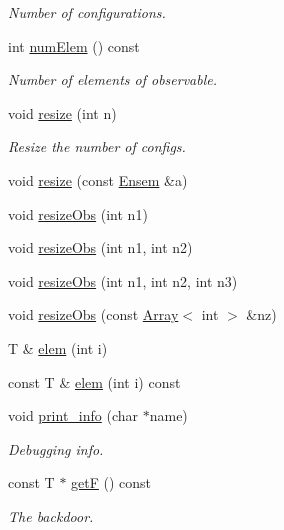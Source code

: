 \begin{DoxyCompactItemize}
\begin{DoxyCompactList}\small\item\em Number of configurations. \end{DoxyCompactList}\item 
int \mbox{\hyperlink{classENSEM_1_1Ensem_a495a563176192200eca2f16978158750}{num\+Elem}} () const
\begin{DoxyCompactList}\small\item\em Number of elements of observable. \end{DoxyCompactList}\item 
void \mbox{\hyperlink{classENSEM_1_1Ensem_ae43aa68aaca92143baffe83310657f4a}{resize}} (int n)
\begin{DoxyCompactList}\small\item\em Resize the number of configs. \end{DoxyCompactList}\item 
void \mbox{\hyperlink{classENSEM_1_1Ensem_acf1e1629e4e10dbd254d81d14271b763}{resize}} (const \mbox{\hyperlink{classENSEM_1_1Ensem}{Ensem}} \&a)
\item 
void \mbox{\hyperlink{classENSEM_1_1Ensem_a20ee27dffc4b1db635103ce40fb0d5c2}{resize\+Obs}} (int n1)
\item 
void \mbox{\hyperlink{classENSEM_1_1Ensem_af74074307267e421a53a3e9e9e2449fc}{resize\+Obs}} (int n1, int n2)
\item 
void \mbox{\hyperlink{classENSEM_1_1Ensem_a8d63351cad23f2af13f26c7326d1abcf}{resize\+Obs}} (int n1, int n2, int n3)
\item 
void \mbox{\hyperlink{classENSEM_1_1Ensem_a4acf05018e5c49c0053dbe8cf76a4252}{resize\+Obs}} (const \mbox{\hyperlink{classXMLArray_1_1Array}{Array}}$<$ int $>$ \&nz)
\item 
T \& \mbox{\hyperlink{classENSEM_1_1Ensem_a4927ebde99b1f0a03cdcfe3fc88458a5}{elem}} (int i)
\item 
const T \& \mbox{\hyperlink{classENSEM_1_1Ensem_a03e45aba3d9addb16e117debbc4e1a33}{elem}} (int i) const
\item 
void \mbox{\hyperlink{classENSEM_1_1Ensem_a85302bace1110e35249c88486f88d80c}{print\+\_\+info}} (char $\ast$name)
\begin{DoxyCompactList}\small\item\em Debugging info. \end{DoxyCompactList}\item 
const T $\ast$ \mbox{\hyperlink{classENSEM_1_1Ensem_ad2cb7a34934bedeaa29f49c78cdb8371}{getF}} () const
\begin{DoxyCompactList}\small\item\em The backdoor. \end{DoxyCompactList}\item 

\end{DoxyCompactItemize}
